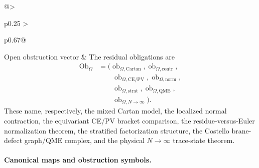 \begin{longtable}{@{}>{\raggedright\arraybackslash}p{}
  >{\raggedright\arraybackslash}p{}@{}}
\hline
Open obstruction vector &
The residual obligations are
\[
  \begin{aligned}
  \operatorname{Ob}_\Omega
  &=
  \bigl(\operatorname{ob}_{\Omega,\mathrm{Cartan}},
        \operatorname{ob}_{\Omega,\mathrm{contr}},\\
  &\qquad
        \operatorname{ob}_{\Omega,\mathrm{CE/PV}},
        \operatorname{ob}_{\Omega,\mathrm{norm}},\\
  &\qquad
        \operatorname{ob}_{\Omega,\mathrm{strat}},
        \operatorname{ob}_{\Omega,\mathrm{QME}},\\
  &\qquad
        \operatorname{ob}_{\Omega,N\to\infty}\bigr).
  \end{aligned}
\]
These name, respectively, the mixed Cartan model, the localized normal
contraction, the equivariant CE/PV bracket comparison, the
residue-versus-Euler normalization theorem, the stratified factorization
structure, the Costello brane-defect graph/QME complex, and the physical
\(N\to\infty\) trace-state theorem.\\
\hline
\end{longtable}

\paragraph{Canonical maps and obstruction symbols.}

